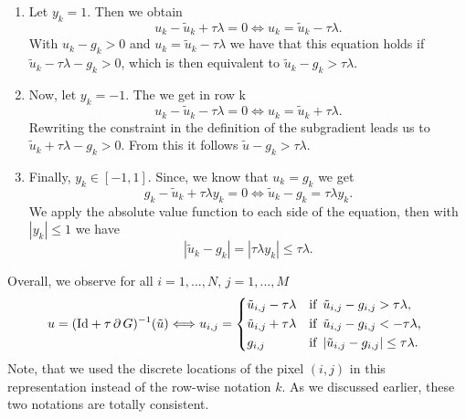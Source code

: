             \begin{enumerate}
                \item Let $y_{k} = 1$. Then we obtain
                    $$
                        u_{k} - \tilde{u}_{k} + \tau\lambda = 0 \Longleftrightarrow u_{k} = \tilde{u}_{k} - \tau\lambda.
                    $$
                With $u_{k} - g_{k} > 0$ and $u_{k} = \tilde{u}_{k} - \tau\lambda$ we have that this equation holds if $\tilde{u}_{k} - \tau\lambda - g_{k} > 0$, which is then equivalent to $\tilde{u}_{k} - g_{k} > \tau\lambda$.
                \item Now, let $y_{k} = -1$. The we get in row k
                    $$
                        u_{k} - \tilde{u}_{k} - \tau\lambda = 0 \Longleftrightarrow u_{k} = \tilde{u}_{k} + \tau\lambda.
                    $$
                Rewriting the constraint in the definition of the subgradient leads us to $\tilde{u}_{k} + \tau\lambda - g_{k} > 0$. From this it follows $\tilde{u} - g_{k} > \tau\lambda$.
                \item Finally, $y_{k} \in [-1, 1]$. Since, we know that $u_{k} = g_{k}$ we get
                    $$
                        g_{k} - \tilde{u}_{k} + \tau\lambda y_{k} = 0 \Longleftrightarrow \tilde{u}_{k} - g_{k} = \tau\lambda y_{k}.
                    $$
                We apply the absolute value function to each side of the equation, then with $|y_{k}| \le 1$ we have
                    $$
                        |\tilde{u}_{k} - g_{k}| = |\tau\lambda y_{k}| \le \tau\lambda.
                    $$
            \end{enumerate}
        Overall, we observe for all $i = 1, ..., N$, $j = 1, ..., M$
            \begin{equation}
                u = (\textnormal{Id} + \tau\,\partial\,G)^{-1}(\tilde{u}) \Longleftrightarrow u_{i, j} = 
                    \begin{dcases*}
                        \tilde{u}_{i,j} - \tau\lambda & \textnormal{if\, $\tilde{u}_{i,j} - g_{i,j} > \tau\lambda$,} \\
                        \tilde{u}_{i,j} + \tau\lambda & \textnormal{if\, $\tilde{u}_{i,j} - g_{i,j} < - \tau\lambda$,} \\
                        g_{i, j} & \textnormal{if\, $|\tilde{u}_{i,j} - g_{i,j}| \le \tau\lambda$}.
                    \end{dcases*}
            \label{eq:prox_g_tvl1}
            \end{equation}
        Note, that we used the discrete locations of the pixel $(i, j)$ in this representation instead of the row-wise notation $k$. As we discussed earlier, these two notations are totally consistent.


